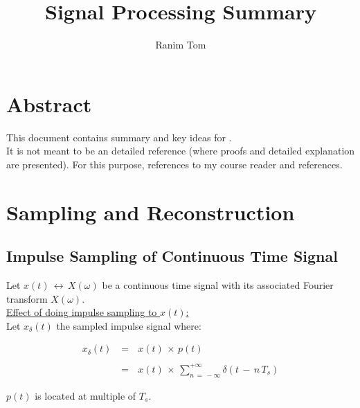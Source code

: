 \documentclass[12pt,a4paper]{book}
\title{Signal Processing Summary}
\author{Ranim Tom}
\begin{document}
% 

\maketitle
\tableofcontents




\pagestyle{fancy}
\fancyhf{} %
\rhead{\rightmark}


\chapter{Abstract}

This document contains summary and key ideas for .\\

It is not meant to be an detailed reference (where proofs and detailed explanation are presented). For this purpose, references to my course reader and references.

\chapter{Sampling and Reconstruction}


\section{Impulse Sampling of Continuous Time Signal}

Let $x(t) \, \leftrightarrow \, X(\omega)$ be a continuous time signal with its associated Fourier transform $X(\omega)$.\\

\underline{Effect of doing impulse sampling to $x(t)$:}\\

Let $x_{\delta}(t)$ the sampled impulse signal where:

\begin{equation}
\begin{array}{rcl}
x_{\delta}(t) \, &=& \, x(t) \, \times \, p(t) \\ \\
				&=& \, x(t) \, \times \, \displaystyle\sum\limits_{n \, = \, - \infty}^{+ \infty} \delta (t \, - \, n \, T_s)
\end{array}
\end{equation}
 
$p(t)$ is  located at multiple of $T_s$.\\
\end{document}
